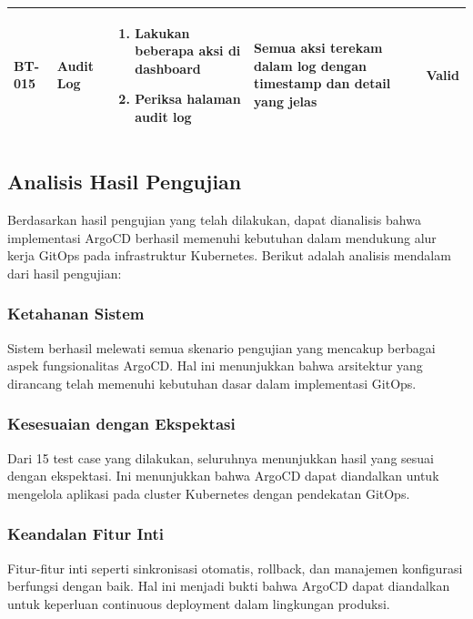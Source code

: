 \begin{table}[H]
\begin{adjustbox}{width=\textwidth}
\begin{tabular}{|p{0.8cm}|p{2.2cm}|p{4cm}|p{3.5cm}|p{1.2cm}|}
      BT-015            & Audit Log               & \begin{enumerate}[leftmargin=*,noitemsep,topsep=0pt,label=\arabic*.,widest=99]
                                                      \item Lakukan beberapa aksi di dashboard
                                                      \item Periksa halaman audit log
                                                    \end{enumerate}        & Semua aksi terekam dalam log dengan timestamp dan detail yang jelas & Valid                                                            \\ \hline
    \end{tabular}
  \end{adjustbox}
\end{table}

\subsection{Analisis Hasil Pengujian}\label{subsec:analisis_hasil}
Berdasarkan hasil pengujian yang telah dilakukan, dapat dianalisis bahwa
implementasi ArgoCD berhasil memenuhi kebutuhan dalam mendukung alur kerja
GitOps pada infrastruktur Kubernetes. Berikut adalah analisis mendalam dari
hasil pengujian:

\subsubsection{Ketahanan Sistem}
Sistem berhasil melewati semua skenario pengujian yang mencakup berbagai aspek
fungsionalitas ArgoCD. Hal ini menunjukkan bahwa arsitektur yang dirancang
telah memenuhi kebutuhan dasar dalam implementasi GitOps.

\subsubsection{Kesesuaian dengan Ekspektasi}
Dari 15 test case yang dilakukan, seluruhnya menunjukkan hasil yang sesuai
dengan ekspektasi. Ini menunjukkan bahwa ArgoCD dapat diandalkan untuk
mengelola aplikasi pada cluster Kubernetes dengan pendekatan GitOps.

\subsubsection{Keandalan Fitur Inti}
Fitur-fitur inti seperti sinkronisasi otomatis, rollback, dan manajemen
konfigurasi berfungsi dengan baik. Hal ini menjadi bukti bahwa ArgoCD dapat
diandalkan untuk keperluan continuous deployment dalam lingkungan produksi.

